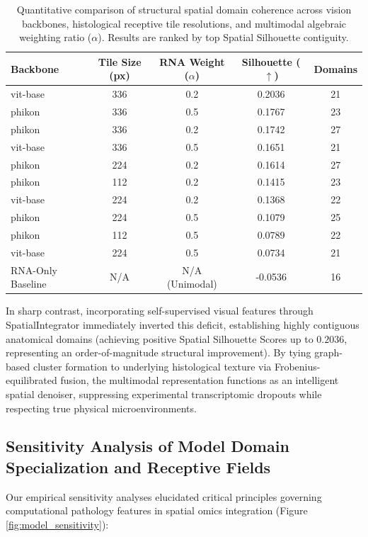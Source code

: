 \documentclass[11pt, a4paper]{article}
\begin{document}
\begin{table}[h!]
\centering
\begin{tabular}{l c c c c}
\toprule
\textbf{Backbone} & \textbf{Tile Size (px)} & \textbf{RNA Weight ($\alpha$)} & \textbf{Silhouette ($\uparrow$)} & \textbf{Domains} \\
\midrule
vit-base & 336 & 0.2 & 0.2036 & 21 \\
phikon & 336 & 0.5 & 0.1767 & 23 \\
phikon & 336 & 0.2 & 0.1742 & 27 \\
vit-base & 336 & 0.5 & 0.1651 & 21 \\
phikon & 224 & 0.2 & 0.1614 & 27 \\
phikon & 112 & 0.2 & 0.1415 & 23 \\
vit-base & 224 & 0.2 & 0.1368 & 22 \\
phikon & 224 & 0.5 & 0.1079 & 25 \\
phikon & 112 & 0.5 & 0.0789 & 22 \\
vit-base & 224 & 0.5 & 0.0734 & 21 \\
RNA-Only Baseline & N/A & N/A (Unimodal) & -0.0536 & 16 \\
\bottomrule
\end{tabular}
\caption{Quantitative comparison of structural spatial domain coherence across vision backbones, histological receptive tile resolutions, and multimodal algebraic weighting ratio ($\alpha$). Results are ranked by top Spatial Silhouette contiguity.}
\label{tab:benchmark_results}
\end{table}

In sharp contrast, incorporating self-supervised visual features through SpatialIntegrator immediately inverted this deficit, establishing highly contiguous anatomical domains (achieving positive Spatial Silhouette Scores up to $0.2036$, representing an order-of-magnitude structural improvement). By tying graph-based cluster formation to underlying histological texture via Frobenius-equilibrated fusion, the multimodal representation functions as an intelligent spatial denoiser, suppressing experimental transcriptomic dropouts while respecting true physical microenvironments.

\subsection{Sensitivity Analysis of Model Domain Specialization and Receptive Fields}
Our empirical sensitivity analyses elucidated critical principles governing computational pathology features in spatial omics integration (Figure \ref{fig:model_sensitivity}):
\end{document}
